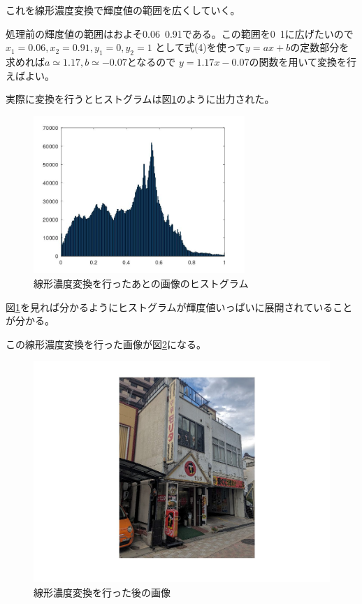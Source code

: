 \documentclass[a4paper,11pt,dvipdfmx]{jsarticle}
\begin{document}
これを線形濃度変換で輝度値の範囲を広くしていく。

処理前の輝度値の範囲はおよそ0.06~0.91である。この範囲を0~1に広げたいので$x_1=0.06,x_2=0.91,y_1=0,y_2=1$
として式(4)を使って$y=ax+b$の定数部分を求めれば$a\simeq 1.17,b\simeq -0.07$となるので
$y=1.17x-0.07$の関数を用いて変換を行えばよい。

実際に変換を行うとヒストグラムは図\ref{afhist}のように出力された。
\begin{figure}[htbp]
    \centering
    \includegraphics[width=80mm]{./img/linear_afterfunc.jpg}
    \caption{線形濃度変換を行ったあとの画像のヒストグラム}
    \label{afhist}
\end{figure}

図\ref{afhist}を見れば分かるようにヒストグラムが輝度値いっぱいに展開されていることが分かる。

\newpage
この線形濃度変換を行った画像が図\ref{afMorita}になる。
\begin{figure}[htbp]
    \centering
    \includegraphics[width=120mm]{./img/linear_afterimg.jpg}
    \caption{線形濃度変換を行った後の画像}
    \label{afMorita}
\end{figure}
\end{document}

